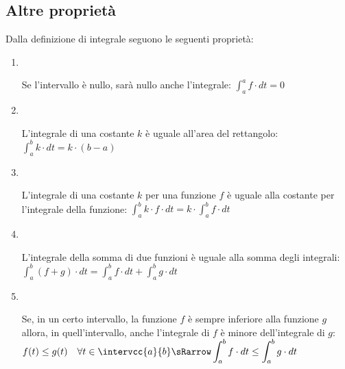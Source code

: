 \subsection{Altre proprietà }
\label{subsec:integrali_altre_proprieta}

Dalla definizione di integrale seguono le seguenti proprietà:
\begin{enumerate}
 \item ~\\ [-3.5em]
\begin{newtheo}{}{}
Se l'intervallo è nullo, sarà nullo anche l'integrale: \quad
\(\displaystyle \int_a^a f \cdot dt = 0\) 
\end{newtheo}

 \item ~\\ [-3.5em]
\begin{newtheo}{}{}
L'integrale di una costante \(k\) è uguale all'area del rettangolo: \\
\hspace*{40mm}
\(\displaystyle \int_a^b k \cdot dt = k \cdot (b-a)\) 
\end{newtheo}

 \item ~\\ [-3.5em]
\begin{newtheo}{}{}
L'integrale di una costante \(k\) per una funzione \(f\) è uguale alla 
costante per l'integrale della funzione: \quad
\(\displaystyle \int_a^b k \cdot f \cdot dt = k\cdot\int_a^b f \cdot dt\) 
\end{newtheo}

 \item ~\\ [-3.5em]
\begin{newtheo}{}{}
L'integrale della somma di due funzioni è uguale alla somma degli 
integrali: \quad
\(\displaystyle 
\int_a^b (f+g)\cdot dt = \int_a^b f \cdot dt + \int_a^b g\cdot dt\) 
\end{newtheo}

 \item ~\\ [-3.5em]
\begin{newtheo}{}{}
Se, in un certo intervallo, la funzione \(f\) è sempre inferiore alla 
funzione \(g\) allora, in quell'intervallo, anche l'integrale di \(f\) è 
minore dell'integrale di \(g\): \quad
\(\displaystyle 
f(t) \le g(t) \quad \forall t \in \intervcc{a}{b} \sRarrow 
\int_a^b f \cdot dt \le \int_a^b g\cdot dt\) 
\end{newtheo}
\end{enumerate}

